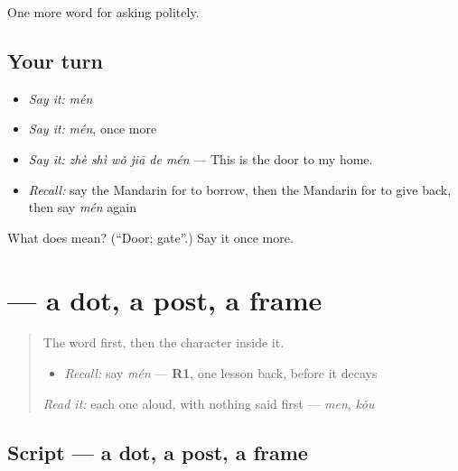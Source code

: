 \begin{grammarlens}[title={What you've built}]
One more word for asking politely.
\end{grammarlens}

\subsection*{Your turn}
\begin{itemize}
\raggedright
  \item \emph{Say it:} \emph{mén}
  \item \emph{Say it:} \emph{mén}, once more
  \item \emph{Say it:} \emph{zhè shì wǒ jiā de mén} — This is the door to my home.
  \item \emph{Recall:} say the Mandarin for to borrow, then the Mandarin for to give back, then say \emph{mén} again
\end{itemize}

\begin{tcolorbox}[breakable,colback=teal!4,colframe=teal!35!black,title={Before you move on}]
What does  mean? (\textquotedblleft{}Door; gate\textquotedblright{}.) Say it once more.
\end{tcolorbox}
\section[\texorpdfstring{\zh{门} (mén)}{门 (mén)}]{ — a dot, a post, a frame}

\label{lesson:ZH-W65-men-door}



\begin{quote}
The word first, then the character inside it.

\begin{itemize}
\raggedright
  \item \emph{Recall:} say \emph{mén} — \textbf{R1}, one lesson back, before it decays
\end{itemize}

\begin{quote}
 
\end{quote}

\emph{Read it:} each one aloud, with nothing said first — \emph{men}, \emph{kǒu}
\end{quote}

\subsection*{Script — a dot, a post, a frame}

